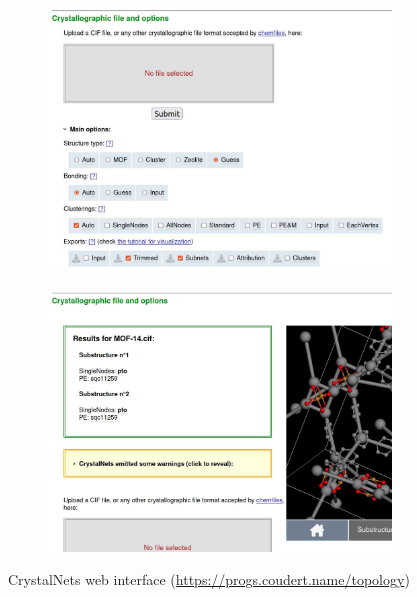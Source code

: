 \documentclass[main.tex]{subfiles}
\begin{document}
\begin{figure}
	\centering
	\begin{subfigure}{\linewidth}
		\centering
		\includegraphics[width=0.9\linewidth]{figures/topology/WebsitePrompt.jpg}
		\label{fig:crystalnetsweb_prompt}
	\end{subfigure}

\vfill

	\begin{subfigure}{\linewidth}
		\centering
		\includegraphics[width=0.9\linewidth]{figures/topology/WebsiteAnswer.jpg}
		\label{fig:crystalnetsweb_answer}
	\end{subfigure}
	\caption{CrystalNets web interface (\url{https://progs.coudert.name/topology})}\label{fig:crystalnetsweb}
\end{figure}
\end{document}
